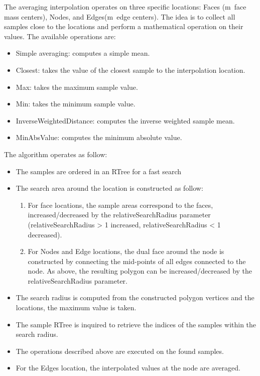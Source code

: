 \documentclass[biblatex]{deltares_manual}
\begin{document}
The averaging interpolation operates on three specific locations: Faces (m\ face mass centers), Nodes, and Edges(m\ edge centers). The idea is to collect all samples close to the locations and perform a mathematical operation on their values. The available operations are:
\begin{itemize}
	\item Simple averaging: computes a simple mean.
	\item Closest: takes the value of the closest sample to the interpolation location.
	\item Max: takes the maximum sample value.
	\item Min: takes the minimum sample value.
	\item InverseWeightedDistance: computes the inverse weighted sample mean.
	\item MinAbsValue: computes the minimum absolute value.
\end{itemize}
The algorithm operates as follow:
\begin{itemize}
	\item The samples are ordered in an RTree for a fast search
	\item The search area around the location is constructed as follow:
\begin{enumerate}
		\item For face locations, the sample areas correspond to the faces, increased/decreased by the relativeSearchRadius parameter (relativeSearchRadius  > 1 increased, relativeSearchRadius < 1 decreased).
		\item For Nodes and Edge locations, the dual face around the node is constructed by connecting the mid-points of all edges connected to the node. As above, the resulting polygon can be increased/decreased by the relativeSearchRadius parameter.
\end{enumerate}
\item The search radius is computed from the constructed polygon vertices and the locations, the maximum value is taken.
\item The sample RTree is inquired to retrieve the indices of the samples within the search radius.
\item The operations described above are executed on the found samples.
\item For the Edges location, the interpolated values at the node are averaged.

\end{itemize}
\end{document}
